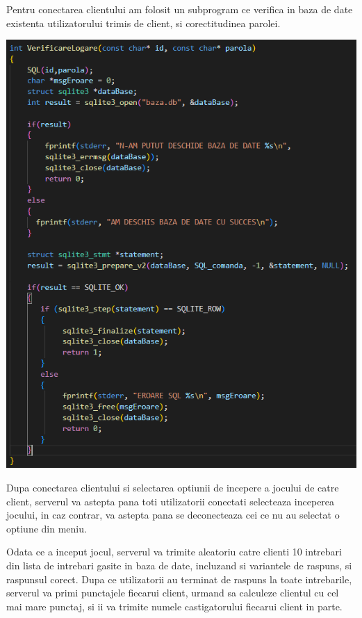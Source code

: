 \documentclass{article}
\begin{document}
Pentru conectarea clientului am folosit un subprogram ce verifica in baza de date existenta utilizatorului trimis de client, si corectitudinea parolei.

\begin{center}
\vspace{0.3cm}
\includegraphics[scale=0.5]{server3}
\vspace{0.3cm}
\end{center}

Dupa conectarea clientului si selectarea optiunii de incepere a jocului de catre client, serverul va astepta pana toti utilizatorii conectati selecteaza inceperea jocului, in caz contrar, va astepta pana se deconecteaza cei ce nu au selectat o optiune din meniu. 

Odata ce a inceput jocul, serverul va trimite aleatoriu catre clienti 10 intrebari din lista de intrebari gasite in baza de date, incluzand si variantele de raspuns, si raspunsul corect. Dupa ce utilizatorii au terminat de raspuns la toate intrebarile, serverul va primi punctajele fiecarui client, urmand sa calculeze clientul cu cel mai mare punctaj, si ii va trimite numele castigatorului fiecarui client in parte.
\end{document}
